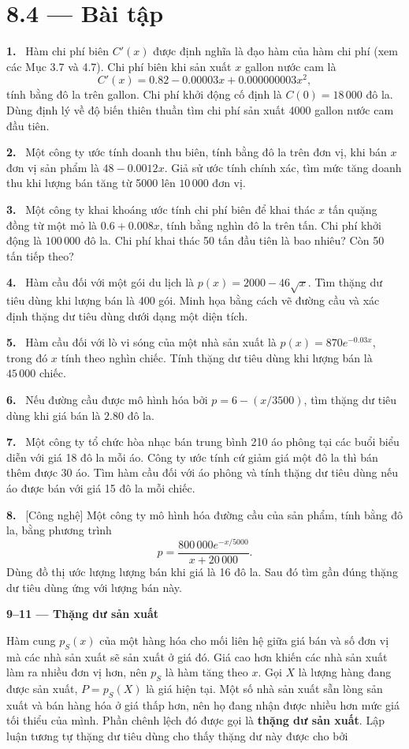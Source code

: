 \documentclass[12pt,a4paper]{article}
\newcommand{\bt}[1]{\par\smallskip\Needspace{5\baselineskip}\noindent\textbf{#1.}\ }
\newcommand{\group}[1]{\par\Needspace{11\baselineskip}\medskip\noindent\textbf{#1}\par\nopagebreak[4]}
\begin{document}
\section*{8.4 — Bài tập}
\bt{1} Hàm chi phí biên $C'(x)$ được định nghĩa là đạo hàm của hàm chi phí (xem các Mục 3.7 và 4.7). Chi phí biên khi sản xuất $x$ gallon nước cam là
\[C'(x)=0.82-0.00003x+0.000000003x^2,\]
tính bằng đô la trên gallon. Chi phí khởi động cố định là $C(0)=18\,000$ đô la. Dùng định lý về độ biến thiên thuần tìm chi phí sản xuất 4000 gallon nước cam đầu tiên.
\bt{2} Một công ty ước tính doanh thu biên, tính bằng đô la trên đơn vị, khi bán $x$ đơn vị sản phẩm là $48-0.0012x$. Giả sử ước tính chính xác, tìm mức tăng doanh thu khi lượng bán tăng từ 5000 lên $10\,000$ đơn vị.
\bt{3} Một công ty khai khoáng ước tính chi phí biên để khai thác $x$ tấn quặng đồng từ một mỏ là $0.6+0.008x$, tính bằng nghìn đô la trên tấn. Chi phí khởi động là $100\,000$ đô la. Chi phí khai thác 50 tấn đầu tiên là bao nhiêu? Còn 50 tấn tiếp theo?
\bt{4} Hàm cầu đối với một gói du lịch là $p(x)=2000-46\sqrt{x}$. Tìm thặng dư tiêu dùng khi lượng bán là 400 gói. Minh họa bằng cách vẽ đường cầu và xác định thặng dư tiêu dùng dưới dạng một diện tích.
\bt{5} Hàm cầu đối với lò vi sóng của một nhà sản xuất là $p(x)=870e^{-0.03x}$, trong đó $x$ tính theo nghìn chiếc. Tính thặng dư tiêu dùng khi lượng bán là $45\,000$ chiếc.
\bt{6} Nếu đường cầu được mô hình hóa bởi $p=6-(x/3500)$, tìm thặng dư tiêu dùng khi giá bán là $2.80$ đô la.
\bt{7} Một công ty tổ chức hòa nhạc bán trung bình 210 áo phông tại các buổi biểu diễn với giá 18 đô la mỗi áo. Công ty ước tính cứ giảm giá một đô la thì bán thêm được 30 áo. Tìm hàm cầu đối với áo phông và tính thặng dư tiêu dùng nếu áo được bán với giá 15 đô la mỗi chiếc.
\bt{8} [Công nghệ] Một công ty mô hình hóa đường cầu của sản phẩm, tính bằng đô la, bằng phương trình
\[p=\frac{800\,000e^{-x/5000}}{x+20\,000}.\]
Dùng đồ thị ước lượng lượng bán khi giá là 16 đô la. Sau đó tìm gần đúng thặng dư tiêu dùng ứng với lượng bán này.
\group{9–11 — Thặng dư sản xuất} Hàm cung $p_S(x)$ của một hàng hóa cho mối liên hệ giữa giá bán và số đơn vị mà các nhà sản xuất sẽ sản xuất ở giá đó. Giá cao hơn khiến các nhà sản xuất làm ra nhiều đơn vị hơn, nên $p_S$ là hàm tăng theo $x$. Gọi $X$ là lượng hàng đang được sản xuất, $P=p_S(X)$ là giá hiện tại. Một số nhà sản xuất sẵn lòng sản xuất và bán hàng hóa ở giá thấp hơn, nên họ đang nhận được nhiều hơn mức giá tối thiểu của mình. Phần chênh lệch đó được gọi là \textbf{thặng dư sản xuất}. Lập luận tương tự thặng dư tiêu dùng cho thấy thặng dư này được cho bởi
\end{document}
